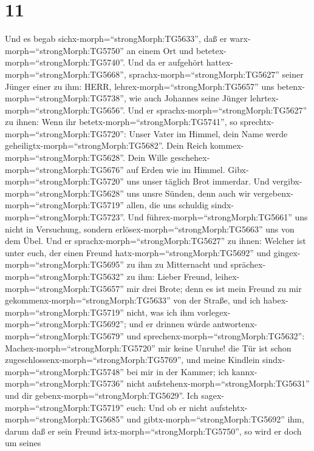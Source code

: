 \hypertarget{section-10}{%
\section{11}\label{section-10}}

 Und es begab sichx-morph=``strongMorph:TG5633'', daß er
warx-morph=``strongMorph:TG5750'' an einem Ort und
betetex-morph=``strongMorph:TG5740''. Und da er aufgehört
hattex-morph=``strongMorph:TG5668'',
sprachx-morph=``strongMorph:TG5627'' seiner Jünger einer zu ihm: HERR,
lehrex-morph=``strongMorph:TG5657'' uns
betenx-morph=``strongMorph:TG5738'', wie auch Johannes seine Jünger
lehrtex-morph=``strongMorph:TG5656''.  Und er
sprachx-morph=``strongMorph:TG5627'' zu ihnen: Wenn ihr
betetx-morph=``strongMorph:TG5741'', so
sprechtx-morph=``strongMorph:TG5720'': Unser Vater im Himmel, dein Name
werde geheiligtx-morph=``strongMorph:TG5682''. Dein Reich
kommex-morph=``strongMorph:TG5628''. Dein Wille
geschehex-morph=``strongMorph:TG5676'' auf Erden wie im Himmel.
 Gibx-morph=``strongMorph:TG5720'' uns unser täglich Brot
immerdar.  Und vergibx-morph=``strongMorph:TG5628'' uns
unsre Sünden, denn auch wir vergebenx-morph=``strongMorph:TG5719''
allen, die uns schuldig sindx-morph=``strongMorph:TG5723''. Und
führex-morph=``strongMorph:TG5661'' uns nicht in Versuchung, sondern
erlösex-morph=``strongMorph:TG5663'' uns von dem Übel.  Und
er sprachx-morph=``strongMorph:TG5627'' zu ihnen: Welcher ist unter
euch, der einen Freund hatx-morph=``strongMorph:TG5692'' und
gingex-morph=``strongMorph:TG5695'' zu ihm zu Mitternacht und
sprächex-morph=``strongMorph:TG5632'' zu ihm: Lieber Freund,
leihex-morph=``strongMorph:TG5657'' mir drei Brote;  denn es
ist mein Freund zu mir gekommenx-morph=``strongMorph:TG5633'' von der
Straße, und ich habex-morph=``strongMorph:TG5719'' nicht, was ich ihm
vorlegex-morph=``strongMorph:TG5692'';  und er drinnen würde
antwortenx-morph=``strongMorph:TG5679'' und
sprechenx-morph=``strongMorph:TG5632'':
Machex-morph=``strongMorph:TG5720'' mir keine Unruhe! die Tür ist schon
zugeschlossenx-morph=``strongMorph:TG5769'', und meine Kindlein
sindx-morph=``strongMorph:TG5748'' bei mir in der Kammer; ich
kannx-morph=``strongMorph:TG5736'' nicht
aufstehenx-morph=``strongMorph:TG5631'' und dir
gebenx-morph=``strongMorph:TG5629''.  Ich
sagex-morph=``strongMorph:TG5719'' euch: Und ob er nicht
aufstehtx-morph=``strongMorph:TG5685'' und
gibtx-morph=``strongMorph:TG5692'' ihm, darum daß er sein Freund
istx-morph=``strongMorph:TG5750'', so wird er doch um seines
